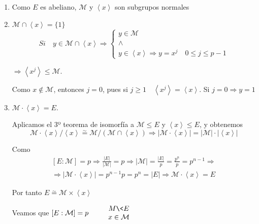 \documentclass{article}
\begin{document}
\begin{enumerate}[1)]
\item Como $E$ es abeliano, $\mathcal{M}$ y $\left\langle x\right\rangle$ son subgrupos normales

\item $\mathcal{M}\cap \left\langle x\right\rangle =\{1\}$
\begin{equation*}
Si\quad y\in \mathcal{M}\cap \left\langle x\right\rangle \Rightarrow \left\lbrace \begin{array}{c}
y\in \mathcal{M}\\
\wedge\\
y\in \left\langle x\right\rangle \Rightarrow y=x^j\quad 0\leq j\leq p-1
\end{array}\right.
\end{equation*}

$\Rightarrow \left\langle x^j\right\rangle \leq \mathcal{M}$.

Como $x\notin \mathcal{M}$, entonces $j=0$, pues si $j\geq 1\quad \left\langle x^j\right\rangle=\left\langle x\right\rangle$. Si $j=0\Rightarrow y=1$

\item $\mathcal{M}\cdot \left\langle x \right\rangle =E$.

Aplicamos el 3º teorema de isomorfía a $\mathcal{M}\leq E$ y $\left\langle x\right\rangle \leq E$, y obtenemos
\begin{equation*}
\mathcal{M}\cdot \left\langle x\right\rangle /\left\langle x\right\rangle \overset{\sim}{=} \mathcal{M}/(\mathcal{M}\cap \left\langle x\right\rangle)\Rightarrow |\mathcal{M}\cdot \left\langle x\right\rangle |=|\mathcal{M}|\cdot |\left\langle x\right\rangle |
\end{equation*}

Como 
\begin{gather*}
\left[E:\mathcal{M}\right]=p\Rightarrow\frac{|E|}{|\mathcal{M}|}=p\Rightarrow |\mathcal{M}|=\frac{|E|}{p}=\frac{p^n}{p}=p^{n-1}\Rightarrow \\
\Rightarrow |\mathcal{M}\cdot \left\langle x\right\rangle|=p^{n-1}p=p^n=|E|\Rightarrow \mathcal{M}\cdot \left\langle x\right\rangle =E
\end{gather*}

Por tanto $E\overset{\sim}{=}\mathcal{M}\times \left\langle x\right\rangle$

Veamos que $\left[E:\mathcal{M}\right]=p\qquad \left.\begin{array}{c}
M\< E\\
x\in \mathcal{M}
\end{array}\right.$


\end{enumerate}
\end{document}
